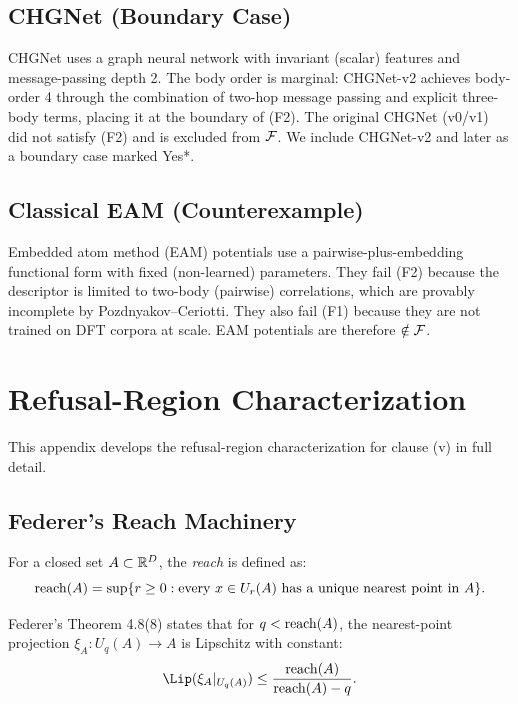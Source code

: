 \subsection{CHGNet (Boundary Case)}

CHGNet\cite{deng2023chgnet} uses a graph neural network with invariant (scalar) features and message-passing depth 2. The body order is marginal: CHGNet-v2 achieves body-order 4 through the combination of two-hop message passing and explicit three-body terms, placing it at the boundary of (F2). The original CHGNet (v0/v1) did not satisfy (F2) and is excluded from $\mathcal{F}$. We include CHGNet-v2 and later as a boundary case marked Yes*.

\subsection{Classical EAM (Counterexample)}

Embedded atom method (EAM) potentials\cite{daw1984embedded} use a pairwise-plus-embedding functional form with fixed (non-learned) parameters. They fail (F2) because the descriptor is limited to two-body (pairwise) correlations, which are provably incomplete by Pozdnyakov--Ceriotti\cite{pozdnyakov2020incompleteness}. They also fail (F1) because they are not trained on DFT corpora at scale. EAM potentials are therefore $\notin \mathcal{F}$.

\section{Refusal-Region Characterization}\label{app:refusal}

This appendix develops the refusal-region characterization for clause (v) in full detail.

\subsection{Federer's Reach Machinery}

For a closed set $A \subset \mathbb{R}^D$, the \emph{reach} is defined as:
\begin{equation}\label{eq:reach-def}
    \mathrm{reach}(A) = \sup\{r \geq 0 : \text{every } x \in U_r(A) \text{ has a unique nearest point in } A\}.
\end{equation}

Federer's Theorem 4.8(8)\cite{federer1959curvature} states that for $q < \mathrm{reach}(A)$, the nearest-point projection $\xi_A: U_q(A) \to A$ is Lipschitz with constant:
\begin{equation}\label{eq:federer-lipschitz}
    \Lip(\xi_A|_{U_q(A)}) \leq \frac{\reach(A)}{\reach(A) - q}.
\end{equation}

